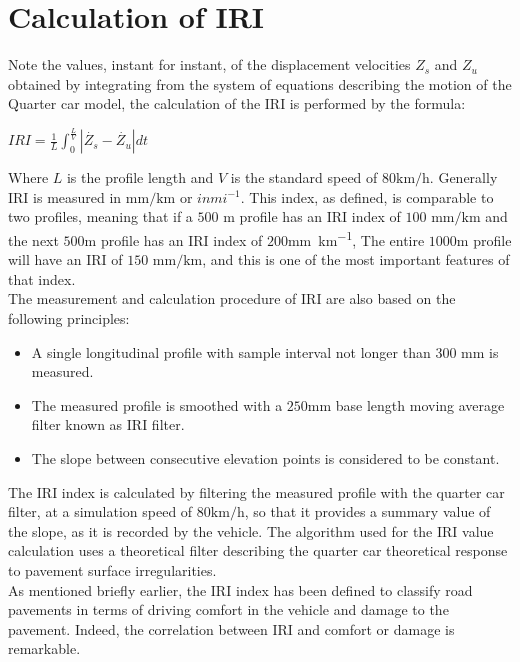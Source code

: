 \documentclass[tesi]{subfiles}
\begin{document}
\section{Calculation of IRI}\label{sc:Calculation of IRI}
Note the values, instant for instant, of the displacement velocities $Z_{s}$  and $Z_{u}$ obtained by integrating from the system of equations describing the motion of the Quarter car model, the calculation of the IRI is performed by the formula:
\begin{center}
{\LARGE $IRI = \frac{1}{L} \int_{0}^{\frac{L}{V}} | \dot{Z_{s}} - \dot{Z_{u}} | dt$}
\end{center}


\noindent Where $L$ is the profile length and $V$ is the standard speed of $\num{80} \si{\km\per\hour}$. Generally IRI is measured in $\si{\milli\meter\per\km}$ or $in mi^{-1}$. This index, as defined, is comparable to two profiles, meaning that if a $500$ $\si{\meter}$ profile has an IRI index of $100$ $\si{\milli\meter\per\km}$ and the next $500$\si{\meter} profile has an IRI index of $200$\si{\milli\meter\per\km}, The entire $1000$\si{\meter} profile will have an IRI of $150$ $\si{\milli\meter\per\km}$, and this is one of the most important features of that index\cite{little_book}. \\

\noindent The measurement and calculation procedure of IRI are also based on the following principles:
\begin{itemize}

\item A single longitudinal profile with sample interval not longer than $300$ $\si{\milli\meter}$ is measured.
\item The measured profile is smoothed with a $250$\si{\milli\meter} base length moving average filter known as IRI filter.
\item The slope between consecutive elevation points is considered to be constant.

\end{itemize}
\noindent The IRI index is calculated by filtering the measured profile with the quarter car filter, at a simulation speed of $\num{80} \si{\km\per\hour}$, so that it provides a summary value of the slope, as it is recorded by the vehicle. The algorithm used for the IRI value calculation uses a theoretical filter describing the quarter car theoretical response to pavement surface irregularities.
\\
\noindent As mentioned briefly earlier, the IRI index has been defined to classify road pavements in terms of driving comfort in the vehicle and damage to the pavement. Indeed, the correlation between IRI and comfort or damage is remarkable\cite{gillespie1992everything}.\\
\end{document}
